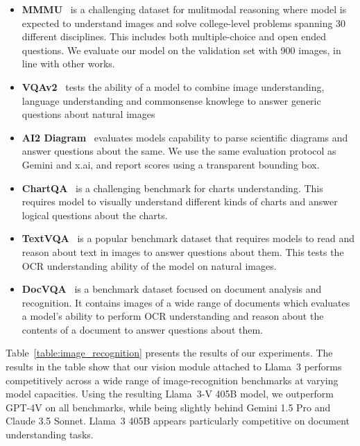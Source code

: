 \begin{itemize}
\item \textbf{MMMU}~\citep{yue2023mmmu} is a challenging dataset for mulitmodal reasoning where model is expected to understand images and solve college-level problems spanning 30 different disciplines. This includes both multiple-choice and open ended questions. We evaluate our model on the validation set with 900 images, in line with other works.

\item \textbf{VQAv2}~\citep{vqav2} tests the ability of a model to combine image understanding, language understanding and commonsense knowlege to answer generic questions about natural images \item \textbf{AI2 Diagram}~\citep{Kembhavi2016ADI} evaluates models capability to parse scientific diagrams and answer questions about the same. We use the same evaluation protocol as Gemini and x.ai, and report scores using a transparent bounding box.

\item \textbf{ChartQA}~\citep{masry-etal-2022-chartqa} is a challenging benchmark for charts understanding. This requires model to visually understand different kinds of charts and answer logical questions about the charts.

\item \textbf{TextVQA}~\citep{singh2019towards} is a popular benchmark dataset that requires models to read and reason about text in images to answer questions about them. This tests the OCR understanding ability of the model on natural images.

\item \textbf{DocVQA}~\citep{Mathew2020DocVQAAD} is a benchmark dataset focused on document analysis and recognition. It contains images of a wide range of documents which evaluates a model's ability to perform OCR understanding and reason about the contents of a document to answer questions about them.
\end{itemize}

Table~\ref{table:image_recognition} presents the results of our experiments. The results in the table show that our vision module attached to Llama~3 performs competitively across a wide range of image-recognition benchmarks at varying model capacities. Using the resulting Llama~3-V 405B model, we outperform GPT-4V on all benchmarks, while being slightly behind Gemini 1.5 Pro and Claude 3.5 Sonnet. Llama~3 405B appears particularly competitive on document understanding tasks.

